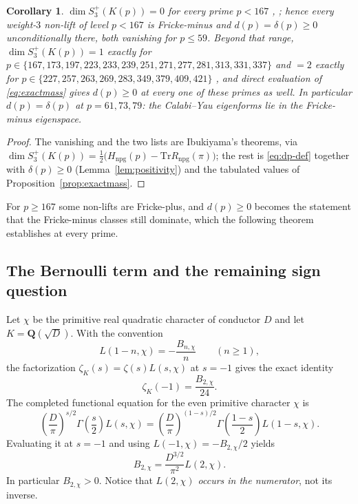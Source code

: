 \documentclass[11pt]{amsart}
\theoremstyle{plain}
\newtheorem{corollary}[theorem]{Corollary}
\theoremstyle{definition}
\newcommand{\Tr}{\mathrm{Tr}}
\begin{document}
	\begin{corollary}\label{thm:uncond-regime}
		$\dim S_3^+(K(p))=0$ for every prime $p<167$
		\cite[Cor.~5.3]{Ibukiyama2019quinary},
		\cite[Prop.~8.2]{Ibukiyama-dim}; hence every weight-$3$ non-lift of level
		$p<167$ is Fricke-minus and $d(p)=\delta(p)\ge0$ unconditionally there,
		both vanishing for $p\le59$. Beyond that range, $\dim S_3^+(K(p))=1$
		exactly for $p\in\{167,173,197,223,233,239,251,271,277,281,313,331,337\}$
		and $=2$ exactly for
		$p\in\{227,257,263,269,283,349,379,409,421\}$
		\cite[Prop.~8.2]{Ibukiyama-dim}, and direct evaluation of
		\eqref{eq:exactmass} gives $d(p)\ge0$ at every one of these primes as
		well. In particular $d(p)=\delta(p)$ at $p=61,73,79$: the Calabi--Yau
		eigenforms lie in the Fricke-minus eigenspace.
	\end{corollary}
	
	\begin{proof}
		The vanishing and the two lists are Ibukiyama's theorems, via
		$\dim S_3^+(K(p))=\tfrac12\bigl(H_{\mathrm{npg}}(p)-\Tr
		R_{\mathrm{npg}}(\pi)\bigr)$; the rest is \eqref{eq:dp-def} together with
		$\delta(p)\ge0$ (Lemma~\ref{lem:positivity}) and the tabulated values of
		Proposition~\ref{prop:exactmass}.
	\end{proof}
	
	For $p\ge167$ some non-lifts are Fricke-plus, and $d(p)\ge0$ becomes the
	statement that the Fricke-minus classes still dominate, which the
	following theorem establishes at every prime.
	
	\subsection{The Bernoulli term and the remaining sign question}
	\label{ss:bernoulli-term}
	
	Let $\chi$ be the primitive real quadratic character of conductor $D$ and
	let $K=\mathbf Q(\sqrt D)$.  With the convention
	\[
	L(1-n,\chi)=-\frac{B_{n,\chi}}{n}\qquad(n\geq1),
	\]
	the factorization $\zeta_K(s)=\zeta(s)L(s,\chi)$ at $s=-1$ gives the
	exact identity
	\begin{equation}\label{eq:B2-zetaK}
		\zeta_K(-1)=\frac{B_{2,\chi}}{24}.
	\end{equation}
	The completed functional equation for the even primitive character $\chi$ is
	\[
	\left(\frac{D}{\pi}\right)^{s/2}\Gamma\!\left(\frac{s}{2}\right)L(s,\chi)
	=
	\left(\frac{D}{\pi}\right)^{(1-s)/2}
	\Gamma\!\left(\frac{1-s}{2}\right)L(1-s,\chi).
	\]
	Evaluating it at $s=-1$ and using
	$L(-1,\chi)=-B_{2,\chi}/2$ yields
	\begin{equation}\label{eq:B2-functional-equation}
		B_{2,\chi}=\frac{D^{3/2}}{\pi^2}L(2,\chi).
	\end{equation}
	In particular $B_{2,\chi}>0$.  Notice that \emph{$L(2,\chi)$ occurs in
		the numerator}, not its inverse.
	
\end{document}
